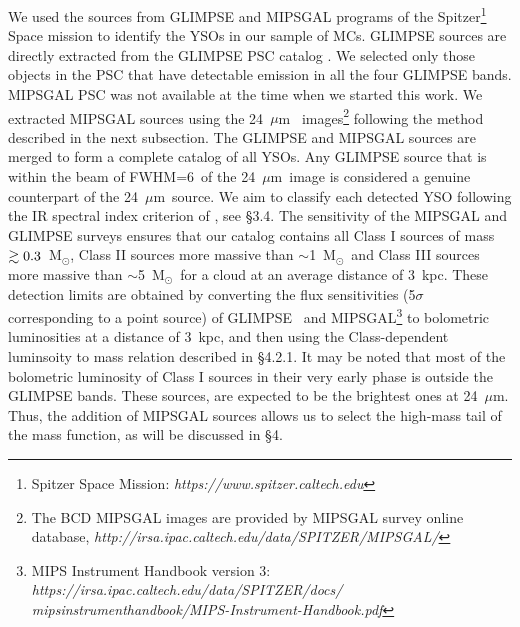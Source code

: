 \documentclass[iop]{emulateapj}
\newcommand{\msun}{M$_{\odot}$}
\newcommand{\mipslam}{24~$\mu$m}
\begin{document}
We used the sources from GLIMPSE and MIPSGAL programs of the 
Spitzer\footnote{Spitzer Space Mission: {\it https://www.spitzer.caltech.edu}}
Space mission to identify the YSOs in our sample of MCs. 
GLIMPSE sources are directly extracted from the GLIMPSE PSC catalog
\citep{benjamin+03}. We selected only those objects in the PSC that
have detectable emission in all the four GLIMPSE bands.
MIPSGAL PSC \citep{gutermuth+15} was not available at the time when we started this
work. We extracted MIPSGAL sources using the \mipslam~ images\footnote{The
BCD MIPSGAL images are provided by MIPSGAL survey online database,
{\it http://irsa.ipac.caltech.edu/data/SPITZER/MIPSGAL/}} \citep{carey+09}
following the method described in the next subsection. 
The GLIMPSE and MIPSGAL sources are merged to form a complete catalog of all YSOs.
Any GLIMPSE source that is within the beam of FWHM=6\arcsec\ of the \mipslam~image
is considered a genuine counterpart of the \mipslam ~source.
We aim to classify each detected YSO following the IR spectral index 
criterion of \citet{lada87}, see \S3.4.
The sensitivity of the MIPSGAL and GLIMPSE surveys ensures that our catalog
contains all Class I sources of mass $\rm \gtrsim0.3$~\msun, Class II sources 
more massive than $\sim$1~\msun ~and Class III  sources more massive than 
$\sim$5~\msun ~for a cloud at an average distance of 3~kpc.
These detection limits 
are obtained by converting the flux sensitivities (5$\sigma$ corresponding to a point source) of GLIMPSE~\citep{churchwell+06}  
and MIPSGAL\footnote{MIPS Instrument Handbook version 3: {\it https://irsa.ipac.caltech.edu/data/SPITZER/docs/\\
mipsinstrumenthandbook/MIPS-Instrument-Handbook.pdf}} 
to bolometric luminosities at a distance of 3~kpc, and then using the Class-dependent
luminsoity to mass relation described in \S4.2.1.
It may be noted that most of the bolometric luminosity of Class I sources 
in their very early phase is outside the GLIMPSE bands. These sources,
are expected to be the brightest ones at \mipslam. Thus, the addition of MIPSGAL
sources allows us to select the high-mass tail of the mass function, as will
be discussed in \S4.
\end{document}
